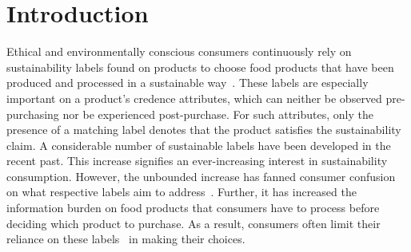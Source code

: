 \documentclass[sustainability,article,accept,moreauthors,pdftex,10pt,a4paper]{Definitions/mdpi}
\theoremstyle{mdpi}
\newcounter{ex}
\newcounter{re}
\theoremstyle{mdpidefinition}
\begin{document}
\section{Introduction}
\par{Ethical and environmentally conscious consumers continuously rely on sustainability labels found on products to choose food products that have been produced and processed in a sustainable way~\cite{Verbeke2005,Grunert2005,Bublitz2010}. These labels are especially important on a product's credence attributes, which can neither be observed pre-purchasing nor be experienced post-purchase. For such attributes, only the presence of a matching label denotes that the product satisfies the sustainability claim. A considerable number of sustainable labels have been developed in the recent past. This increase signifies an ever-increasing interest in sustainability consumption. However, the unbounded increase has fanned consumer confusion on what respective labels aim to address~\cite{ayuso2006,Horne2009,Grunert2011,Grunert2014}. Further, it has increased the information burden on food products that consumers have to process before deciding which product to purchase. As a result, consumers often limit their reliance on these labels~\cite{Verbeke2008,Grunert2011} in making their choices.}
\end{document}
